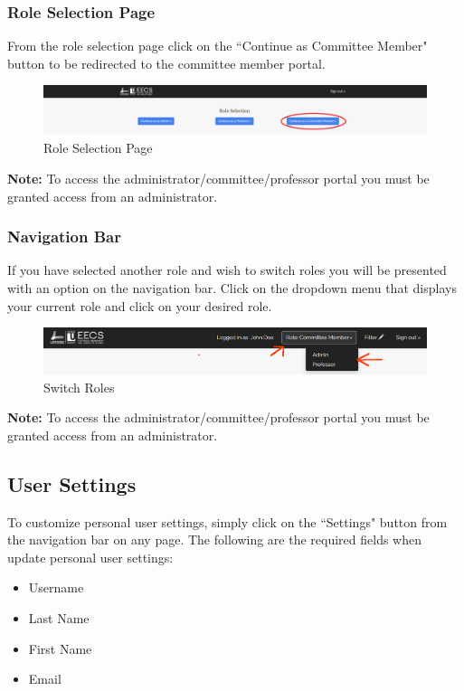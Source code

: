 \documentclass[fontsize=12pt,paper=letter,twoside]{scrartcl}
\begin{document}
\subsubsection{Role Selection Page}
From the role selection page click on the ``Continue as Committee Member" button to be redirected to the committee member portal.

\begin{figure}[!htb]
\begin{center}
\includegraphics[width=.99\textwidth]{images/auth.png}
\end{center}
\caption{Role Selection Page}
\label{fig:role_selection1}
\end{figure}

\noindent \textbf{Note:} To access the administrator/committee/professor portal you must be granted access from an administrator.

\subsubsection{Navigation Bar}
If you have selected another role and wish to switch roles you will be presented with an option on the navigation bar. Click on the dropdown menu that displays your current role and click on your desired role.
\begin{figure}[!htb]
\begin{center}
\includegraphics[width=.99\textwidth]{images/role-selection2.png}
\end{center}
\caption{Switch Roles}
\label{fig:role_selection2}
\end{figure}

\noindent \textbf{Note:} To access the administrator/committee/professor portal you must be granted access from an administrator.

\subsection{User Settings}
\label{user-settings}
To customize personal user settings, simply click on the ``Settings" button from the navigation bar on any page. The following are the required fields when update personal user settings:
\begin{itemize}
\item Username
\item Last Name
\item First Name
\item Email
\end{itemize}
\end{document}
